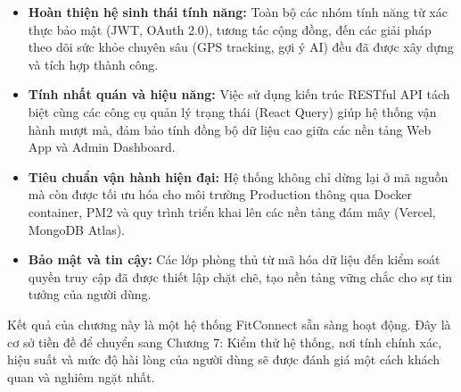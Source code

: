 \begin{itemize}
    \item \textbf{Hoàn thiện hệ sinh thái tính năng:} Toàn bộ các nhóm tính năng từ xác thực bảo mật (JWT, OAuth 2.0), tương tác cộng đồng, đến các giải pháp theo dõi sức khỏe chuyên sâu (GPS tracking, gợi ý AI) đều đã được xây dựng và tích hợp thành công.
    \item \textbf{Tính nhất quán và hiệu năng:} Việc sử dụng kiến trúc RESTful API tách biệt cùng các công cụ quản lý trạng thái (React Query) giúp hệ thống vận hành mượt mà, đảm bảo tính đồng bộ dữ liệu cao giữa các nền tảng Web App và Admin Dashboard.
    \item \textbf{Tiêu chuẩn vận hành hiện đại:} Hệ thống không chỉ dừng lại ở mã nguồn mà còn được tối ưu hóa cho môi trường Production thông qua Docker container, PM2 và quy trình triển khai lên các nền tảng đám mây (Vercel, MongoDB Atlas).
    \item \textbf{Bảo mật và tin cậy:} Các lớp phòng thủ từ mã hóa dữ liệu đến kiểm soát quyền truy cập đã được thiết lập chặt chẽ, tạo nền tảng vững chắc cho sự tin tưởng của người dùng.
\end{itemize}

Kết quả của chương này là một hệ thống FitConnect sẵn sàng hoạt động. Đây là cơ sở tiền đề để chuyển sang Chương 7: Kiểm thử hệ thống, nơi tính chính xác, hiệu suất và mức độ hài lòng của người dùng sẽ được đánh giá một cách khách quan và nghiêm ngặt nhất.
